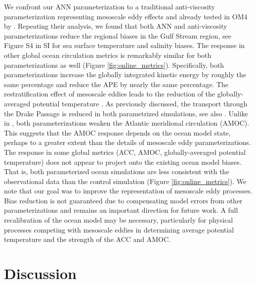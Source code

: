 \documentclass[draft]{agujournal2019}
\begin{document}
We confront our ANN parameterization to a traditional anti-viscosity parameterization representing mesoscale eddy effects \cite{jansen2015energy} and already tested in OM4 by . Repeating their analysis, we found that both ANN and anti-viscosity parameterizations reduce the regional biases in the Gulf Stream region, see Figure S4 in SI for sea surface temperature and salinity biases. The response in other global ocean circulation metrics is remarkably similar for both parameterizations as well (Figure \ref{fig:online_metrics}). Specifically, both parameterizations increase the globally integrated kinetic energy by roughly the same percentage and reduce the APE by nearly the same percentage. The restratification effect of mesoscale eddies leads to the reduction of the globally-averaged potential temperature \cite{griffies2015impacts, adcroft2019gfdl}. As previously discussed, the transport through the Drake Passage is reduced in both parametrized simulations, see also . Unlike in , both parameterizations weaken the Atlantic meridional circulation (AMOC). This suggests that the AMOC response depends on the ocean model state, perhaps to a greater extent than the details of mesoscale eddy parameterizations. The response in some global metrics (ACC, AMOC, globally-averaged potential temperature) does not appear to project onto the existing ocean model biases. 
That is, both parameterized ocean simulations are less consistent with the observational data than the control simulation (Figure \ref{fig:online_metrics}). 
We note that our goal was to improve the representation of mesoscale eddy processes. Bias reduction is not guaranteed due to compensating model errors from other parameterizations and remains an important direction for future work. A full recalibration of the ocean model may be necessary, particularly for physical processes competing with mesoscale eddies in determining average potential temperature and the strength of the ACC and AMOC.




\section{Discussion}
\end{document}
